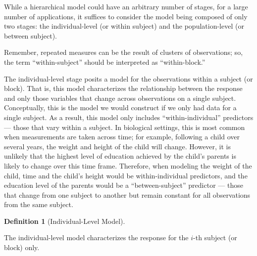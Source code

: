 \documentclass[
  letterpaper,
  DIV=11,
  numbers=noendperiod]{scrreprt}
\theoremstyle{definition}
\theoremstyle{definition}
\newtheorem{definition}{Definition}[chapter]
\theoremstyle{remark}
\begin{document}
While a hierarchical model could have an arbitrary number of stages, for
a large number of applications, it suffices to consider the model being
composed of only two stages: the individual-level (or within subject)
and the population-level (or between subject).

\begin{tcolorbox}[enhanced jigsaw, bottomrule=.15mm, titlerule=0mm, bottomtitle=1mm, colback=white, coltitle=black, rightrule=.15mm, leftrule=.75mm, toprule=.15mm, toptitle=1mm, left=2mm, opacityback=0, colframe=quarto-callout-note-color-frame, breakable, title=\textcolor{quarto-callout-note-color}{\faInfo}\hspace{0.5em}{Note}, arc=.35mm, colbacktitle=quarto-callout-note-color!10!white, opacitybacktitle=0.6]

Remember, repeated measures can be the result of clusters of
observations; so, the term ``within-subject'' should be interpreted as
``within-block.''

\end{tcolorbox}

The individual-level stage posits a model for the observations within a
subject (or block). That is, this model characterizes the relationship
between the response and only those variables that change across
observations on a single subject. Conceptually, this is the model we
would construct if we only had data for a single subject. As a result,
this model only includes ``within-individual'' predictors --- those that
vary within a subject. In biological settings, this is most common when
measurements are taken across time; for example, following a child over
several years, the weight and height of the child will change. However,
it is unlikely that the highest level of education achieved by the
child's parents is likely to change over this time frame. Therefore,
when modeling the weight of the child, time and the child's height would
be within-individual predictors, and the education level of the parents
would be a ``between-subject'' predictor --- those that change from one
subject to another but remain constant for all observations from the
same subject.

\begin{definition}[Individual-Level
Model]\protect\hypertarget{def-individual-model}{}\label{def-individual-model}

The individual-level model characterizes the response for the \(i\)-th
subject (or block) only.

\end{definition}
\end{document}
